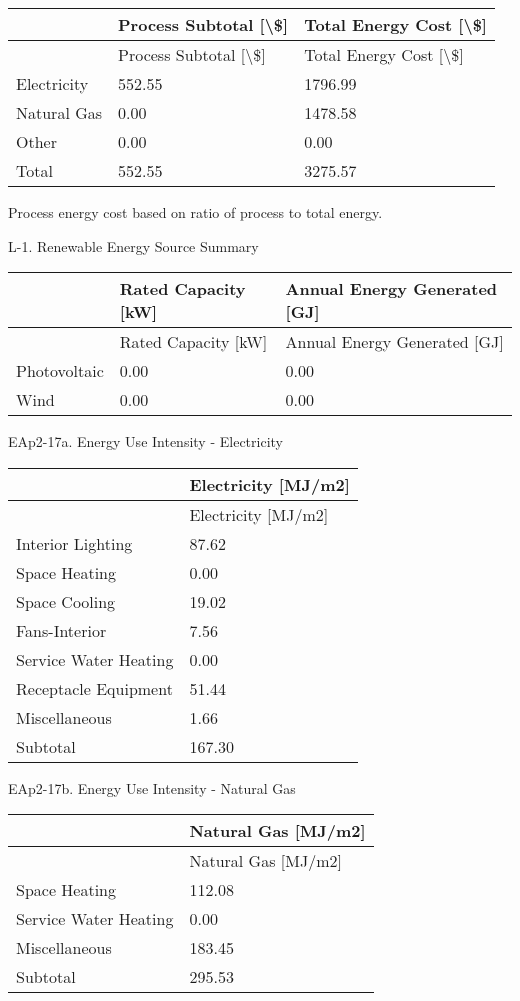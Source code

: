 \begin{longtable}[c]{>{\raggedright}p{1.5in}>{\raggedright}p{2.21in}>{\raggedright}p{2.28in}}
\toprule 
 & Process Subtotal [\textbackslash\$] & Total Energy Cost [\textbackslash\$] \tabularnewline
\midrule
\endfirsthead

\toprule 
 & Process Subtotal [\textbackslash\$] & Total Energy Cost [\textbackslash\$] \tabularnewline
\midrule
\endhead

Electricity & 552.55 & 1796.99 \tabularnewline
Natural Gas & 0.00 & 1478.58 \tabularnewline
Other & 0.00 & 0.00 \tabularnewline
Total & 552.55 & 3275.57 \tabularnewline
\bottomrule
\end{longtable}

Process energy cost based on ratio of process to total energy.

L-1. Renewable Energy Source Summary

\begin{longtable}[c]{@{}lll@{}}
\toprule 
 & Rated Capacity [kW] & Annual Energy Generated [GJ] \tabularnewline
\midrule
\endfirsthead

\toprule 
 & Rated Capacity [kW] & Annual Energy Generated [GJ] \tabularnewline
\midrule
\endhead

Photovoltaic & 0.00 & 0.00 \tabularnewline
Wind & 0.00 & 0.00 \tabularnewline
\bottomrule
\end{longtable}

EAp2-17a. Energy Use Intensity - Electricity

\begin{longtable}[c]{@{}ll@{}}
\toprule 
 & Electricity [MJ/m2] \tabularnewline
\midrule
\endfirsthead

\toprule 
 & Electricity [MJ/m2] \tabularnewline
\midrule
\endhead

Interior Lighting & 87.62 \tabularnewline
Space Heating & 0.00 \tabularnewline
Space Cooling & 19.02 \tabularnewline
Fans-Interior & 7.56 \tabularnewline
Service Water Heating & 0.00 \tabularnewline
Receptacle Equipment & 51.44 \tabularnewline
Miscellaneous & 1.66 \tabularnewline
Subtotal & 167.30 \tabularnewline
\bottomrule
\end{longtable}

EAp2-17b. Energy Use Intensity - Natural Gas

\begin{longtable}[c]{@{}ll@{}}
\toprule 
 & Natural Gas [MJ/m2] \tabularnewline
\midrule
\endfirsthead

\toprule 
 & Natural Gas [MJ/m2] \tabularnewline
\midrule
\endhead

Space Heating & 112.08 \tabularnewline
Service Water Heating & 0.00 \tabularnewline
Miscellaneous & 183.45 \tabularnewline
Subtotal & 295.53 \tabularnewline
\bottomrule
\end{longtable}

